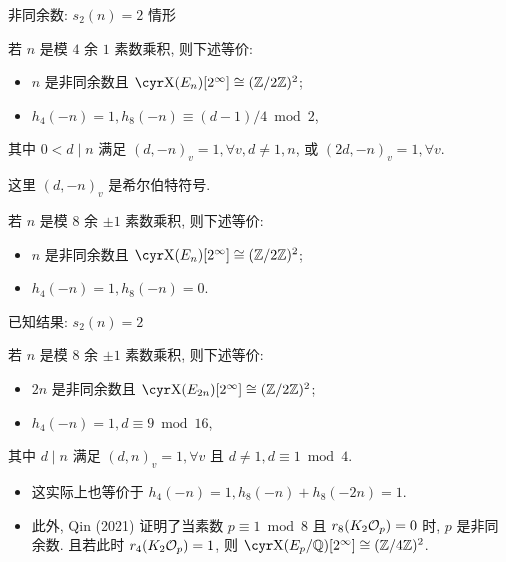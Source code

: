 \documentclass[aspectratio=169,handout]{ctexbeamer}
\begin{document}
\begin{frame}{非同余数: $s_2(n)=2$ 情形}
  \begin{theorem}[{Wang 2016}]
    若 $n$ 是模 $4$ 余 $1$ 素数乘积, 则下述等价:
    \begin{itemize}[<*>]
      \item $n$ 是非同余数且 $\Sha(E_n)[2^\infty]\cong(\BZ/2\BZ)^2$;
      \item $h_4(-n)=1,h_8(-n)\equiv (d-1)/4\bmod 2$,
    \end{itemize}
    其中 $0<d\mid n$ 满足 $(d,-n)_v=1,\forall v, d\ne 1,n$, 或 $(2d,-n)_v=1,\forall v$.
  \end{theorem}
  这里 $(d,-n)_v$ 是希尔伯特符号.
  \onslide<+->
  \begin{theorem}
    若 $n$ 是模 $8$ 余 $\pm1$ 素数乘积, 则下述等价:
    \begin{itemize}[<*>]
      \item $n$ 是非同余数且 $\Sha(E_n)[2^\infty]\cong(\BZ/2\BZ)^2$;
      \item $h_4(-n)=1, h_8(-n)=0$.
    \end{itemize}
  \end{theorem}
\end{frame}


\begin{frame}{已知结果: $s_2(n)=2$}  
  \begin{theorem}[{Zhang 2023}]
    \label{thm:3}
    若 $n$ 是模 $8$ 余 $\pm1$ 素数乘积, 则下述等价:
    \begin{itemize}[<*>]
      \item $2n$ 是非同余数且 $\Sha(E_{2n})[2^\infty]\cong(\BZ/2\BZ)^2$;
      \item $h_4(-n)=1,d\equiv 9\bmod 16$,
    \end{itemize}
    其中 $d\mid n$ 满足 $(d,n)_v=1,\forall v$ 且 $d\ne 1,d\equiv 1\bmod 4$.
  \end{theorem}
  \begin{itemize}
    \item 这实际上也等价于 $h_4(-n)=1,h_8(-n)+h_8(-2n)=1$.
    \item 此外, Qin (2021) 证明了当素数 $p\equiv 1\bmod 8$ 且 $r_8(K_2{\mathcal{O}}_p)=0$ 时, $p$ 是非同余数.
    且若此时 $r_4(K_2{\mathcal{O}}_p)=1$, 则 $\Sha(E_p/\BQ)[2^\infty]\cong(\BZ/4\BZ)^2$.
  \end{itemize}  
\end{frame}
\end{document}
